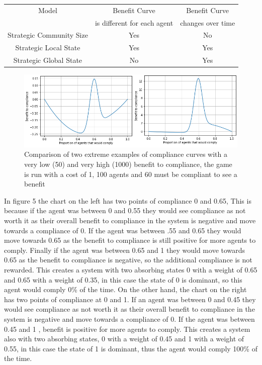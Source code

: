 \documentclass{article}
\begin{document}
\begin{tabular}{|c|c|c|}
\hline
Model & Benefit Curve  & Benefit Curve\\ 
&is different for each agent &changes over time \\\hline
Strategic Community Size & Yes & No \\ \hline
Strategic Local State & Yes &Yes\\ \hline
Strategic Global State & No &Yes\\ \hline
\end{tabular}
\newline


\begin{figure}[h!]
\centering
\includegraphics[width=12cm]{strat}
\caption{Comparison of two extreme examples of compliance curves with a very low (50) and very high (1000) benefit to compliance, the game is run with a cost of 1, 100 agents and 60 must be compliant to see a benefit}
\end{figure}

In figure 5 the chart on the left has two points of compliance 0 and 0.65, This is because if the agent was between 0 and 0.55 they would see compliance as not worth it as their overall benefit to compliance in the system is negative and move towards a compliance of 0. If the agent was between .55 and 0.65 they would move towards 0.65 as the benefit to compliance is still positive for more agents to comply. Finally if the agent was between 0.65 and 1 they would move towards 0.65 as the benefit to compliance is negative, so the additional compliance is not rewarded. This creates a system with two absorbing states 0 with a weight of 0.65 and 0.65 with a weight of 0.35, in this case the state of 0 is dominant, so this agent would comply 0\% of the time. \newline\newline
On the other hand, the chart on the right has two points of compliance at 0 and 1. If an agent was between 0 and 0.45 they would see compliance as not worth it as their overall benefit to compliance in the system is negative and move towards a compliance of 0. If the agent was between 0.45 and 1 , benefit is positive for more agents to comply. This creates a system also with two absorbing states, 0 with a weight of 0.45 and 1 with a weight of 0.55, in this case the state of 1 is dominant, thus the agent would comply 100\% of the time.
\end{document}
